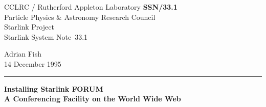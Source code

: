 \documentclass[11pt]{article}
\newcommand{\stardoccategory}  {Starlink System Note}
\newcommand{\stardocinitials}  {SSN}
\newcommand{\stardocnumber}    {33.1}
\newcommand{\stardocauthors}   {Adrian Fish}
\newcommand{\stardocdate}      {14 December 1995}
\newcommand{\stardoctitle}     {Installing Starlink FORUM \\[1.5ex]
                                A Conferencing Facility on the World Wide Web}
\newcommand{\stardocname}{\stardocinitials /\stardocnumber}
\newenvironment{latexonly}{}{}
\begin{document}
\thispagestyle{empty}

\begin{latexonly}
   CCLRC / {\sc Rutherford Appleton Laboratory} \hfill {\bf \stardocname}\\
   {\large Particle Physics \& Astronomy Research Council}\\
   {\large Starlink Project\\}
   {\large \stardoccategory\ \stardocnumber}
   \begin{flushright}
   \stardocauthors\\
   \stardocdate
   \end{flushright}
   \vspace{-4mm}
   \rule{\textwidth}{0.5mm}
   \vspace{5mm}
   \begin{center}
   {\Large\bf \stardoctitle}
   \end{center}
   \vspace{5mm}

\end{latexonly}
\end{document}
